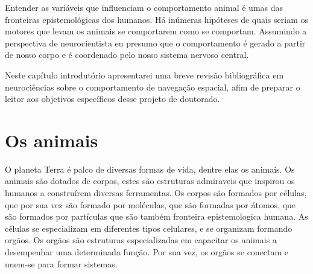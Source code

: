 
\label{Cap:introducao}

Entender as variáveis que influenciam o comportamento animal é umas das fronteiras epistemológicas dos humanos.
Há inúmeras hipóteses de quais seriam os motores que levam os animais se comportarem como se comportam.
Assumindo a perspectiva de neurocientista eu presumo que o comportamento é gerado a partir de nosso corpo e é coordenado pelo nosso sistema nervoso central.

Neste capítulo introdutório apresentarei uma breve revisão bibliográfica em neurociências sobre o comportamento de navegação espacial, afim de preparar o leitor aos objetivos específicos desse projeto de doutorado.

\section{Os animais}

O planeta Terra é palco de diversas formas de vida, dentre elas os animais.
Os animais são dotados de corpos, estes são estruturas admiraveis que inspirou os humanos a construírem diversas ferramentas.
Os corpos são formados por células, que por sua vez são formado por moléculas, que são formadas por átomos, que são formados por partículas que são também fronteira epistemologica humana.
As células se especializam em diferentes tipos celulares, e se organizam formando orgãos.
Os orgãos são estruturas especializadas em capacitar os animais a desempenhar uma determinada função.
Por sua vez, os orgãos se conectam e unem-se para formar sistemas.

